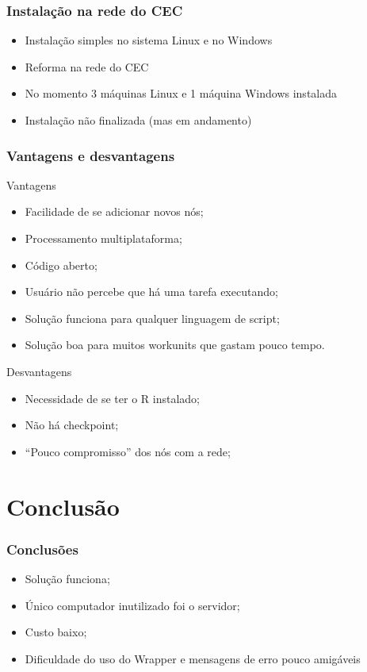 \documentclass{beamer}
\begin{document}
\begin{frame}
  \frametitle{Instalação na rede do CEC}
  \begin{itemize}
    \item Instalação simples no sistema Linux e no Windows
    \item Reforma na rede do CEC
    \item No momento 3 máquinas Linux e 1 máquina Windows instalada
    \item Instalação não finalizada (mas em andamento)
  \end{itemize}
\end{frame}

\begin{frame}
  \frametitle{Vantagens e desvantagens}
  \begin{block}{Vantagens}
  \begin{itemize}
    \item Facilidade de se adicionar novos nós;
    \item Processamento multiplataforma;
    \item Código aberto;
    \item Usuário não percebe que há uma tarefa executando;
    \item Solução funciona para qualquer linguagem de script;
    \item Solução boa para muitos workunits que gastam pouco tempo.
  \end{itemize}
  \end{block}
  \begin{block}{Desvantagens}
  \begin{itemize}
    \item Necessidade de se ter o R instalado;
    \item Não há checkpoint;
    \item ``Pouco compromisso'' dos nós com a rede;
  \end{itemize}
  \end{block}
\end{frame}


\section{Conclusão}

\begin{frame}
  \frametitle{Conclusões}
  \begin{itemize}
    \item Solução funciona;
    \item Único computador inutilizado foi o servidor;
    \item Custo baixo;
    \item Dificuldade do uso do Wrapper e mensagens de erro pouco amigáveis 
  \end{itemize}
\end{frame}
\end{document}
